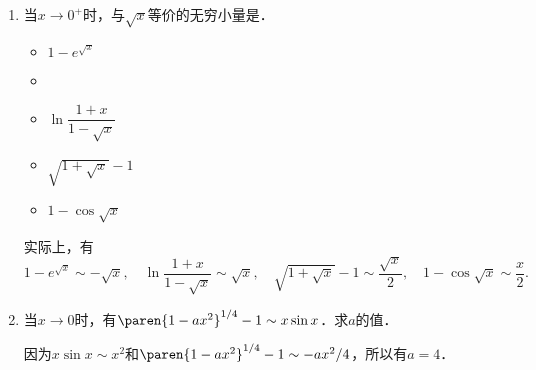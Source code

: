 \begin{enumerate}
\item 当\(x \to 0^+\)时，与\(\sqrt x\)等价的无穷小量是\uline{\makebox[6em]{}}．
  \begin{itemize}
    \renewcommand{\labelitemi}{\faCircleThin}
  \item \(1 - e^{\sqrt x}\)
    \ifshowsol
  \item[\faCircle]
    \else
  \item
    \fi
    \(\ln \dfrac{1+x}{1-\sqrt x}\)\rule[-2ex]{0ex}{5ex}
  \item \(\sqrt{1 + \sqrt x} - 1\)
  \item \(1 - \cos\sqrt x\)
  \end{itemize}

  \ifshowsol
  实际上，有
  \begin{equation*}
    1 - e^{\sqrt x} \sim -\sqrt x, \quad
    \ln \dfrac{1+x}{1-\sqrt x} \sim \sqrt x, \quad
    \sqrt{1 + \sqrt x} - 1 \sim \frac{\sqrt x}{2}, \quad
    1 - \cos\sqrt x \sim \frac x2.
  \end{equation*}
  \fi

\item 当\(x \to 0\)时，有\(\paren{1-ax^2}^{1/4} - 1 \sim x \sin x\)．求\(a\)的值．

  \ifshowsol
  因为\(x \sin x \sim x^2\)和\(\paren{1-ax^2}^{1/4} - 1 \sim -ax^2/4\)，所以有\(a = 4\)．
  \fi
\end{enumerate}
\fi

